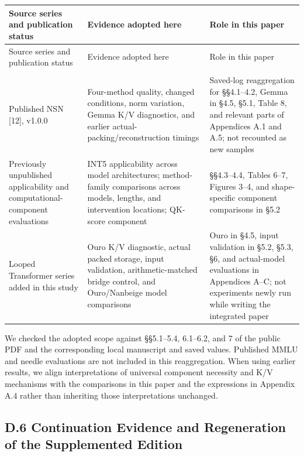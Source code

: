 \documentclass[10pt,a4paper]{article}
\newlength{\usable}
\begin{document}
\begingroup\fontsize{9.1}{12}\selectfont\setlength{\parskip}{1pt}
\setlength{\usable}{\dimexpr\linewidth-4\tabcolsep\relax}
\begin{longtable}{@{}>{\raggedright\arraybackslash}p{0.25\usable}>{\raggedright\arraybackslash}p{0.37\usable}>{\raggedright\arraybackslash}p{0.38\usable}@{}}
\toprule
Source series and publication status & Evidence adopted here & Role in this paper \\
\midrule\endfirsthead
\toprule
Source series and publication status & Evidence adopted here & Role in this paper \\
\midrule\endhead
\midrule
\multicolumn{3}{r}{\scriptsize Continued on the next page}\\\endfoot
\bottomrule\endlastfoot
Published NSN {[}12{]}, v1.0.0 & Four-method quality, changed conditions, norm variation, Gemma K/V diagnostics, and earlier actual-packing/reconstruction timings & Saved-log reaggregation for §§4.1--4.2, Gemma in §4.5, §5.1, Table 8, and relevant parts of Appendices A.1 and A.5; not recounted as new samples \\
Previously unpublished applicability and computational-component evaluations & INT5 applicability across model architectures; method-family comparisons across models, lengths, and intervention locations; QK-score component & §§4.3--4.4, Tables 6--7, Figures 3--4, and shape-specific component comparisons in §5.2 \\
Looped Transformer series added in this study & Ouro K/V diagnostic, actual packed storage, input validation, arithmetic-matched bridge control, and Ouro/Nanbeige model comparisons & Ouro in §4.5, input validation in §5.2, §5.3, §6, and actual-model evaluations in Appendices A--C; not experiments newly run while writing the integrated paper \\
\end{longtable}\endgroup

We checked the adopted scope against §§5.1--5.4, 6.1--6.2, and 7 of the public PDF and the corresponding local manuscript and saved values. Published MMLU and needle evaluations are not included in this reaggregation. When using earlier results, we align interpretations of universal component necessity and K/V mechanisms with the comparisons in this paper and the expressions in Appendix A.4 rather than inheriting those interpretations unchanged.

\subsection{D.6 Continuation Evidence and Regeneration of the Supplemented Edition}\label{d.6-continuation-evidence-and-regeneration-of-the-supplemented-edition}
\end{document}

